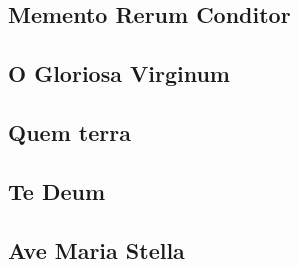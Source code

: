 \label{salutishumanae}


\label{venicreator}


\label{pangelingua}


\subsection{Memento Rerum Conditor}\label{mementorerumconditor}


\subsection{O Gloriosa Virginum}\label{ogloriosavirginum}


\subsection{Quem terra}\label{quemterra}


\label{benedictuses}


\subsection{Te Deum}\label{tedeum}


\subsection{Ave Maria Stella}\label{avemariastella}

